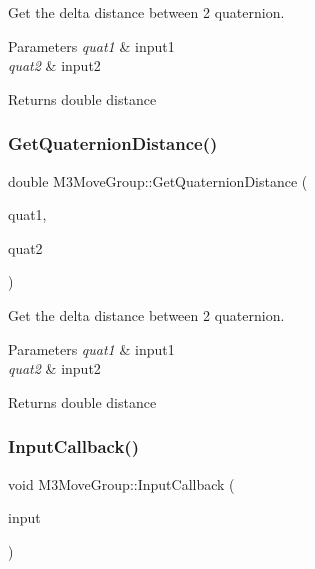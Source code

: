 Get the delta distance between 2 quaternion. 


\begin{DoxyParams}{Parameters}
{\em quat1} & input1 \\
\hline
{\em quat2} & input2 \\
\hline
\end{DoxyParams}
\begin{DoxyReturn}{Returns}
double distance 
\end{DoxyReturn}
\mbox{\label{classM3MoveGroup_a000211da0f2ad520583f9efff2401e7a}} 
\subsubsection{\texorpdfstring{Get\+Quaternion\+Distance()}{GetQuaternionDistance()}\hspace{0.1cm}{\footnotesize\ttfamily [2/2]}}
{\footnotesize\ttfamily double M3\+Move\+Group\+::\+Get\+Quaternion\+Distance (\begin{DoxyParamCaption}\item[{std\+::vector$<$ double $>$}]{quat1,  }\item[{std\+::vector$<$ double $>$}]{quat2 }\end{DoxyParamCaption})\hspace{0.3cm}{\ttfamily [inline]}}



Get the delta distance between 2 quaternion. 


\begin{DoxyParams}{Parameters}
{\em quat1} & input1 \\
\hline
{\em quat2} & input2 \\
\hline
\end{DoxyParams}
\begin{DoxyReturn}{Returns}
double distance 
\end{DoxyReturn}
\mbox{\label{classM3MoveGroup_a0d53e8cfafd00e1a22f1cf5e091b63a1}} 
\subsubsection{\texorpdfstring{Input\+Callback()}{InputCallback()}\hspace{0.1cm}{\footnotesize\ttfamily [1/2]}}
{\footnotesize\ttfamily void M3\+Move\+Group\+::\+Input\+Callback (\begin{DoxyParamCaption}\item[{const std\+\_\+msgs\+::\+Int32\+Const\+Ptr \&}]{input }\end{DoxyParamCaption})\hspace{0.3cm}{\ttfamily [inline]}}



